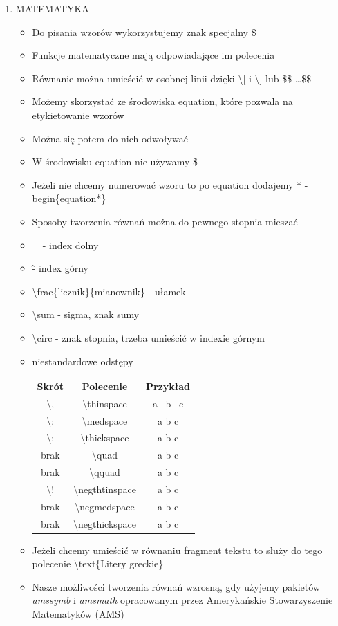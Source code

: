 \documentclass[a4paper,twoside,onecolumn]{report}
\begin{document}
\begin{enumerate}
			\item MATEMATYKA
			\begin{itemize}
				\item Do pisania wzorów wykorzystujemy znak specjalny \$
				\item Funkcje matematyczne mają odpowiadające im polecenia
				\item Równanie można umieścić w osobnej linii dzięki \textbackslash [ i \textbackslash ] lub \$\$ \ldots \$\$
				\item Możemy skorzystać ze środowiska equation, które pozwala na etykietowanie wzorów
				\item Można się potem do nich odwoływać
				\item W środowisku equation nie używamy \$
				\item Jeżeli nie chcemy numerować wzoru to po equation dodajemy * - begin\{equation*\}
				\item Sposoby tworzenia równań można do pewnego stopnia mieszać
				\item \_  - index dolny
				\item \^ - index górny
				\item \textbackslash frac\{licznik\}\{mianownik\} - ułamek
				\item \textbackslash sum - sigma, znak sumy
				\item \textbackslash circ - znak stopnia, trzeba umieścić w indexie górnym
				\item niestandardowe odstępy \\
					\begin{tabular}{ccc}\\
						\textbf{Skrót}      & \textbf{Polecenie}              & \textbf{Przykład} \\
						\textbackslash ,    & \textbackslash thinspace     & a \, b \, c \\
						\textbackslash :  & \textbackslash medspace    & a \: b \: c \\
						\textbackslash ;  & \textbackslash thickspace    & a \; b \; c \\
						brak  & \textbackslash quad    & a \quad b \quad c \\
						brak  & \textbackslash qquad    & a \qquad b \qquad c \\
						\textbackslash !  & \textbackslash negthtinspace    & a \negthinspace b \negthinspace c \\
						brak  & \textbackslash negmedspace    & a \negmedspace b \negmedspace c \\
						brak  & \textbackslash negthickspace    & a \negthickspace b \negthickspace c \\
					\end{tabular}
				\item Jeżeli chcemy umieścić w równaniu fragment tekstu to służy do tego polecenie \textbackslash text\{Litery greckie\}
				\item Nasze możliwości tworzenia równań wzrosną, gdy użyjemy pakietów \emph{amssymb} i \emph{amsmath} opracowanym przez Amerykańskie Stowarzyszenie 							Matematyków (AMS) 
			\end{itemize}


\end{enumerate}
\end{document}
